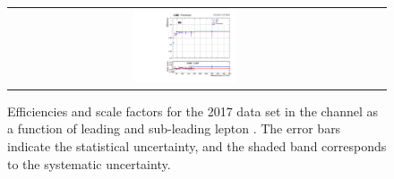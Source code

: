 \begin{figure}[!htb]
\begin{center}
\begin{tabular}{ccc}
      \includegraphics[width=0.30\textwidth]{fig_2017_TrigSF/g_ee_lepBpt_FullSystUncBand.pdf}\\
    \end{tabular}
    \caption{Efficiencies and scale factors for the 2017 data set in the \ee channel as a function of leading and sub-leading lepton \pT.
            The error bars indicate the statistical uncertainty, and the shaded band corresponds to the systematic uncertainty.
            }
    \label{TrigSF_2017_2}
  \end{center}
\end{figure}

